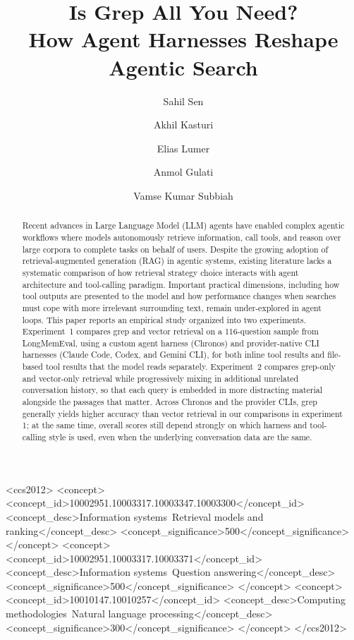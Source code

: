 \documentclass[sigconf,nonacm]{acmart}
\title{Is Grep All You Need? \\How Agent Harnesses Reshape Agentic Search}
\author{Sahil Sen}
\affiliation{\institution{PricewaterhouseCoopers, U.S.}\country{}}
\author{Akhil Kasturi}
\affiliation{\institution{PricewaterhouseCoopers, U.S.}\country{}}
\author{Elias Lumer}
\affiliation{\institution{PricewaterhouseCoopers, U.S.}\country{}}
\author{Anmol Gulati}
\affiliation{\institution{PricewaterhouseCoopers, U.S.}\country{}}
\author{Vamse Kumar Subbiah}
\affiliation{\institution{PricewaterhouseCoopers, U.S.}\country{}}
\begin{document}

\begin{abstract}
Recent advances in Large Language Model (LLM) agents have enabled complex agentic workflows
where models autonomously retrieve information, call tools, and reason over large corpora to
complete tasks on behalf of users. Despite the growing adoption of retrieval-augmented
generation (RAG) in agentic systems, existing literature lacks a systematic comparison of how
retrieval strategy choice interacts with agent architecture and tool-calling paradigm.
Important practical dimensions, including how tool outputs are presented to the model and how
performance changes when searches must cope with more irrelevant surrounding text, remain
under-explored in agent loops. This paper reports an empirical study organized into two
experiments. Experiment~1 compares grep and vector retrieval on a 116-question sample
from LongMemEval, using a custom agent harness (Chronos) and provider-native CLI harnesses
(Claude Code, Codex, and Gemini CLI), for both inline tool results and file-based tool results
that the model reads separately. Experiment~2 compares grep-only and vector-only retrieval
while progressively mixing in additional unrelated conversation history, so that each query is
embedded in more distracting material alongside the passages that matter. Across Chronos and
the provider CLIs, grep generally yields higher accuracy than vector retrieval in our
comparisons in experiment 1; at the same time, overall scores still depend strongly on which harness and
tool-calling style is used, even when the underlying conversation data are the same.
\end{abstract}


\begin{CCSXML}
<ccs2012>
  <concept>
    <concept_id>10002951.10003317.10003347.10003300</concept_id>
    <concept_desc>Information systems~Retrieval models and ranking</concept_desc>
    <concept_significance>500</concept_significance>
  </concept>
  <concept>
    <concept_id>10002951.10003317.10003371</concept_id>
    <concept_desc>Information systems~Question answering</concept_desc>
    <concept_significance>500</concept_significance>
  </concept>
  <concept>
    <concept_id>10010147.10010257</concept_id>
    <concept_desc>Computing methodologies~Natural language processing</concept_desc>
    <concept_significance>300</concept_significance>
  </concept>
</ccs2012>
\end{CCSXML}
\end{document}
